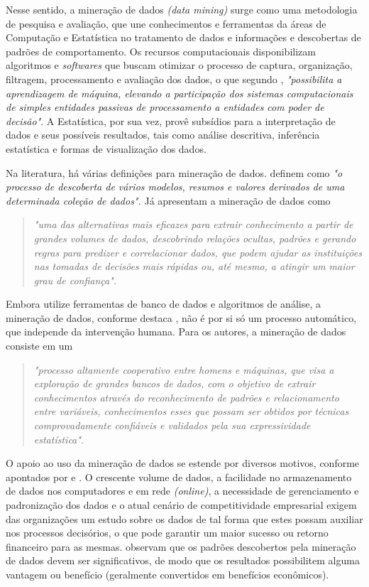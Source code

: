 Nesse sentido, a mineração de dados \textit{(data mining)} surge como uma metodologia de pesquisa e avaliação, que une conhecimentos e ferramentas da áreas de Computação e Estatística no tratamento de dados e informações e descobertas de padrões de comportamento. Os recursos computacionais disponibilizam algoritmos e \textit{softwares} que buscam otimizar o processo de captura, organização, filtragem, processamento e avaliação dos dados, o que segundo \citet[p. 6]{dantas2014}, \textit{"possibilita a aprendizagem de máquina, elevando a participação dos sistemas computacionais de simples entidades passivas de processamento a entidades com poder de decisão"}. A Estatística, por sua vez, provê subsídios para a interpretação de dados e seus possíveis resultados, tais como análise descritiva, inferência estatística e formas de visualização dos dados.

Na literatura, há várias definições para mineração de dados. \citet[p. 6]{dantas2014} definem como \textit{"o processo de descoberta de vários modelos, resumos e valores derivados de uma determinada coleção de dados".} Já \citet[p. 686]{galvao_marin2009} apresentam a mineração de dados como
\begin{quotation} \textit{"uma das alternativas mais eficazes para extrair conhecimento a partir de grandes volumes de dados, descobrindo relações ocultas, padrões e gerando regras para predizer e correlacionar dados, que podem ajudar as instituições nas tomadas de decisões mais rápidas ou, até mesmo, a atingir um maior grau de confiança".}
\end{quotation}

Embora utilize ferramentas de banco de dados e algoritmos de análise, a mineração de dados, conforme destaca \citet[p. 1-2]{cortes2002}, não é por si só um processo automático, que independe da intervenção humana. Para os autores, a mineração de dados consiste em um
\begin{quotation}
 \textit{"processo altamente cooperativo entre homens e máquinas, que visa a exploração de grandes bancos de dados, com o objetivo de extrair conhecimentos através do reconhecimento de padrões e relacionamento entre variáveis, conhecimentos esses que possam ser obtidos por técnicas comprovadamente confiáveis e validados pela sua expressividade estatística"}. 
\end{quotation}


O apoio ao uso da mineração de dados se estende por diversos motivos, conforme apontados por \citet[\textit{apud} Carvalho (2005)]{amorim2006} e \citet{witten2005}. O crescente volume de dados, a facilidade no armazenamento de dados nos computadores e em rede \textit{(online)}, a necessidade de gerenciamento e padronização dos dados e o atual cenário de competitividade empresarial exigem das organizações um estudo sobre os dados de tal forma que estes possam auxiliar nos processos decisórios, o que pode garantir um maior sucesso ou retorno financeiro para as mesmas. \citet{witten2005} observam que os padrões descobertos pela mineração de dados devem ser significativos, de modo que os resultados possibilitem alguma vantagem ou benefício (geralmente convertidos em benefícios econômicos). 

